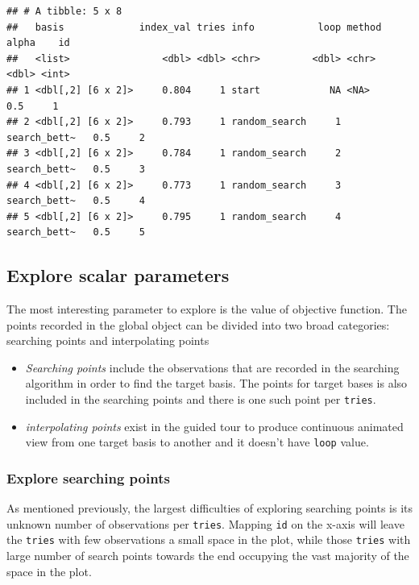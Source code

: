 \documentclass[12pt]{article}
\begin{document}
\begin{verbatim}
## # A tibble: 5 x 8
##   basis             index_val tries info           loop method       alpha    id
##   <list>                <dbl> <dbl> <chr>         <dbl> <chr>        <dbl> <int>
## 1 <dbl[,2] [6 x 2]>     0.804     1 start            NA <NA>           0.5     1
## 2 <dbl[,2] [6 x 2]>     0.793     1 random_search     1 search_bett~   0.5     2
## 3 <dbl[,2] [6 x 2]>     0.784     1 random_search     2 search_bett~   0.5     3
## 4 <dbl[,2] [6 x 2]>     0.773     1 random_search     3 search_bett~   0.5     4
## 5 <dbl[,2] [6 x 2]>     0.795     1 random_search     4 search_bett~   0.5     5
\end{verbatim}

\hypertarget{explore-scalar-parameters}{%
\subsection{Explore scalar parameters}\label{explore-scalar-parameters}}

The most interesting parameter to explore is the value of objective
function. The points recorded in the global object can be divided into
two broad categories: searching points and interpolating points

\begin{itemize}
\item
  \emph{Searching points} include the observations that are recorded in
  the searching algorithm in order to find the target basis. The points
  for target bases is also included in the searching points and there is
  one such point per \texttt{tries}.
\item
  \emph{interpolating points} exist in the guided tour to produce
  continuous animated view from one target basis to another and it
  doesn't have \texttt{loop} value.
\end{itemize}

\hypertarget{explore-searching-points}{%
\subsubsection{Explore searching
points}\label{explore-searching-points}}

As mentioned previously, the largest difficulties of exploring searching
points is its unknown number of observations per \texttt{tries}. Mapping
\texttt{id} on the x-axis will leave the \texttt{tries} with few
observations a small space in the plot, while those \texttt{tries} with
large number of search points towards the end occupying the vast
majority of the space in the plot.
\end{document}
